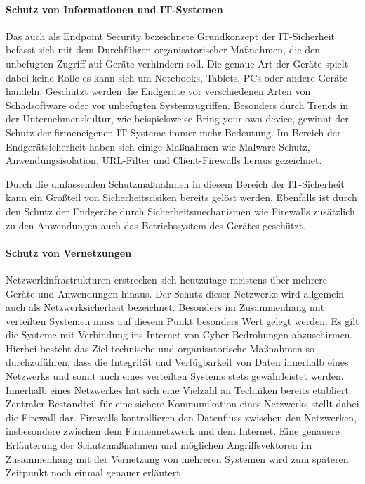 \documentclass[utf8,biblatex]{lni}
\begin{document}
\paragraph{Schutz von Informationen und IT-Systemen}
Das auch als \glqq Endpoint Security\grqq{} bezeichnete Grundkonzept der IT-Sicherheit befasst sich mit dem Durchführen 
organisatorischer Maßnahmen, die den unbefugten Zugriff auf Geräte verhindern soll. 
Die genaue Art der Geräte spielt dabei keine Rolle es kann sich um Notebooks, Tablets, PCs oder andere Geräte handeln. 
Geschützt werden die Endgeräte vor verschiedenen Arten von Schadsoftware oder vor unbefugten Systemzugriffen. 
Besonders durch Trends in der Unternehmenskultur, wie beispielsweise \glqq Bring your own device\grqq{}, gewinnt der Schutz der firmeneigenen 
IT-Systeme immer mehr Bedeutung. 
Im Bereich der Endgerätsicherheit haben sich einige Maßnahmen wie Malware-Schutz, Anwendungsisolation, URL-Filter und Client-Firewalls heraus gezeichnet.
\cite{Luber.2020}

Durch die umfassenden Schutzmaßnahmen in diesem Bereich der IT-Sicherheit kann ein Großteil von Sicherheitsrisiken bereits 
gelöst werden. Ebenfalls ist durch den Schutz der Endgeräte durch Sicherheitsmechanismen wie Firewalls zusätzlich zu den 
Anwendungen auch das Betriebssystem des Gerätes geschützt. 

\paragraph{Schutz von Vernetzungen}
Netzwerkinfrastrukturen erstrecken sich heutzutage meistens über mehrere Geräte und Anwendungen hinaus. Der Schutz dieser 
Netzwerke wird allgemein auch als Netzwerksicherheit bezeichnet. Besonders im Zusammenhang mit verteilten Systemen muss auf diesem Punkt besonders Wert gelegt werden.
Es gilt die Systeme mit Verbindung ins Internet von Cyber-Bedrohungen abzuschirmen. Hierbei besteht das Ziel technische und organisatorische 
Maßnahmen so durchzuführen, dass die Integrität und Verfügbarkeit von Daten innerhalb eines Netzwerks und somit auch eines verteilten Systems stets gewährleistet werden. 
Innerhalb eines Netzwerkes hat sich eine Vielzahl an Techniken bereits etabliert. 
Zentraler Bestandteil für eine sichere Kommunikation eines Netzwerks stellt dabei die Firewall dar. Firewalls kontrollieren den Datenfluss zwischen den 
Netzwerken, insbesondere zwischen dem Firmennetzwerk und dem Internet. Eine genauere Erläuterung der Schutzmaßnahmen und möglichen Angriffsvektoren im Zusammenhang mit 
der Vernetzung von mehreren Systemen wird zum späteren Zeitpunkt noch einmal genauer erläutert \cite{Schonschek.2017b}. 
\end{document}
